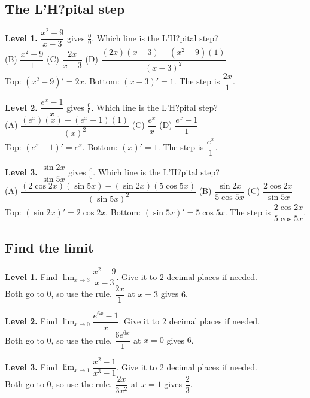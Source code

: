 \documentclass[11pt]{article}
\begin{document}
\subsection*{The L'H?pital step}
\noindent\textbf{Level 1.} $\dfrac{x^2-9}{x-3}$ gives $\frac00$. Which line is the L'H?pital step?\\  \quad (B) $\dfrac{x^2-9}{1}$ \quad (C) $\dfrac{2x}{x-3}$ \quad (D) $\dfrac{(2x)(x-3)-(x^2-9)(1)}{(x-3)^2}$\\  \quad Top: $(x^2-9)'=2x$. Bottom: $(x-3)'=1$. The step is $\dfrac{2x}{1}$.\par\medskip
\noindent\textbf{Level 2.} $\dfrac{e^x-1}{x}$ gives $\frac00$. Which line is the L'H?pital step?\\ (A) $\dfrac{(e^x)(x)-(e^x-1)(1)}{(x)^2}$ \quad {} \quad (C) $\dfrac{e^x}{x}$ \quad (D) $\dfrac{e^x-1}{1}$\\  \quad Top: $(e^x-1)'=e^x$. Bottom: $(x)'=1$. The step is $\dfrac{e^x}{1}$.\par\medskip
\noindent\textbf{Level 3.} $\dfrac{\sin 2x}{\sin 5x}$ gives $\frac00$. Which line is the L'H?pital step?\\ (A) $\dfrac{(2\cos 2x)(\sin 5x)-(\sin 2x)(5\cos 5x)}{(\sin 5x)^2}$ \quad (B) $\dfrac{\sin 2x}{5\cos 5x}$ \quad (C) $\dfrac{2\cos 2x}{\sin 5x}$ \quad {}\\  \quad Top: $(\sin 2x)'=2\cos 2x$. Bottom: $(\sin 5x)'=5\cos 5x$. The step is $\dfrac{2\cos 2x}{5\cos 5x}$.\par\medskip
\subsection*{Find the limit}
\noindent\textbf{Level 1.} Find $\displaystyle\lim_{x\to3}\dfrac{x^2-9}{x-3}$. Give it to 2 decimal places if needed.\\  \quad Both go to 0, so use the rule. $\dfrac{2x}{1}$ at $x=3$ gives $6$.\par\medskip
\noindent\textbf{Level 2.} Find $\displaystyle\lim_{x\to0}\dfrac{e^{6x}-1}{x}$. Give it to 2 decimal places if needed.\\  \quad Both go to 0, so use the rule. $\dfrac{6e^{6x}}{1}$ at $x=0$ gives $6$.\par\medskip
\noindent\textbf{Level 3.} Find $\displaystyle\lim_{x\to1}\dfrac{x^2-1}{x^3-1}$. Give it to 2 decimal places if needed.\\  \quad Both go to 0, so use the rule. $\dfrac{2x}{3x^2}$ at $x=1$ gives $\dfrac{2}{3}$.\par\medskip
\end{document}
